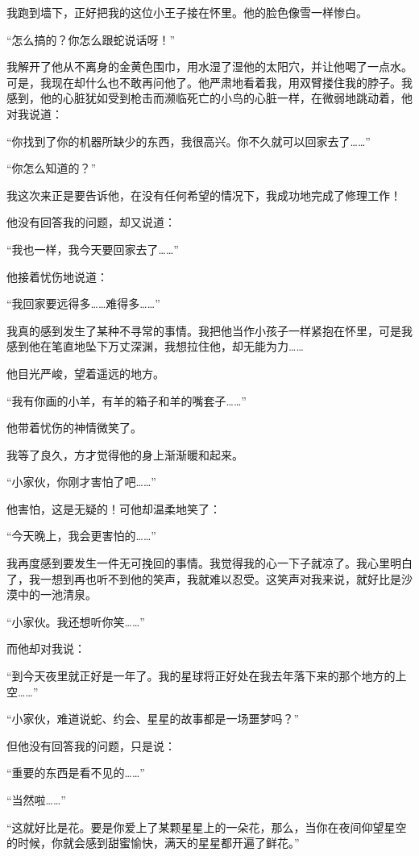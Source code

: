 我跑到墙下，正好把我的这位小王子接在怀里。他的脸色像雪一样惨白。

“怎么搞的？你怎么跟蛇说话呀！”

我解开了他从不离身的金黄色围巾，用水湿了湿他的太阳穴，并让他喝了一点水。可是，我现在却什么也不敢再问他了。他严肃地看着我，用双臂搂住我的脖子。我感到，他的心脏犹如受到枪击而濒临死亡的小鸟的心脏一样，在微弱地跳动着，他对我说道：

“你找到了你的机器所缺少的东西，我很高兴。你不久就可以回家去了\ldots{}\ldots{}”

“你怎么知道的？”

我这次来正是要告诉他，在没有任何希望的情况下，我成功地完成了修理工作！

他没有回答我的问题，却又说道：

“我也一样，我今天要回家去了\ldots{}\ldots{}”

他接着忧伤地说道：

“我回家要远得多\ldots{}\ldots{}难得多\ldots{}\ldots{}”

我真的感到发生了某种不寻常的事情。我把他当作小孩子一样紧抱在怀里，可是我感到他在笔直地坠下万丈深渊，我想拉住他，却无能为力\ldots{}\ldots{}

他目光严峻，望着遥远的地方。

“我有你画的小羊，有羊的箱子和羊的嘴套子\ldots{}\ldots{}”

他带着忧伤的神情微笑了。

我等了良久，方才觉得他的身上渐渐暖和起来。

“小家伙，你刚才害怕了吧\ldots{}\ldots{}”

他害怕，这是无疑的！可他却温柔地笑了：

“今天晚上，我会更害怕的\ldots{}\ldots{}”

我再度感到要发生一件无可挽回的事情。我觉得我的心一下子就凉了。我心里明白了，我一想到再也听不到他的笑声，我就难以忍受。这笑声对我来说，就好比是沙漠中的一池清泉。

“小家伙。我还想听你笑\ldots{}\ldots{}”

而他却对我说：

“到今天夜里就正好是一年了。我的星球将正好处在我去年落下来的那个地方的上空\ldots{}\ldots{}”

“小家伙，难道说蛇、约会、星星的故事都是一场噩梦吗？”

但他没有回答我的问题，只是说：

“重要的东西是看不见的\ldots{}\ldots{}”

“当然啦\ldots{}\ldots{}”

“这就好比是花。要是你爱上了某颗星星上的一朵花，那么，当你在夜间仰望星空的时候，你就会感到甜蜜愉快，满天的星星都开遍了鲜花。”


